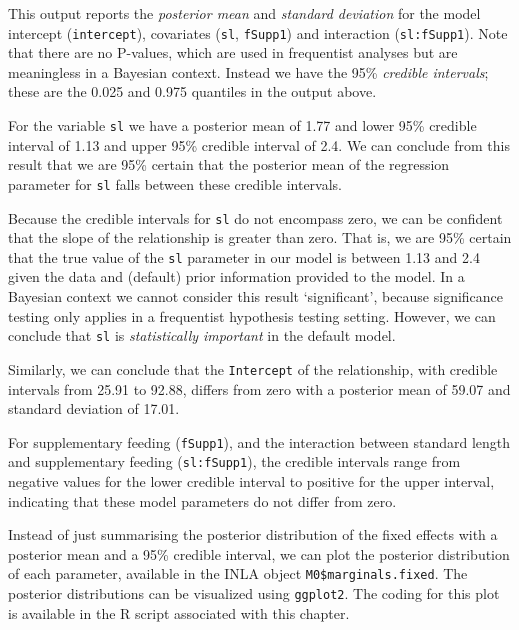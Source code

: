\documentclass[
]{book}
\begin{document}
This output reports the \emph{posterior mean} and \emph{standard deviation} for the model intercept (\texttt{intercept}), covariates (\texttt{sl}, \texttt{fSupp1}) and interaction (\texttt{sl:fSupp1}). Note that there are no P-values, which are used in frequentist analyses but are meaningless in a Bayesian context. Instead we have the 95\% \emph{credible intervals}; these are the 0.025 and 0.975 quantiles in the output above.

For the variable \texttt{sl} we have a posterior mean of 1.77 and lower 95\% credible interval of 1.13 and upper 95\% credible interval of 2.4. We can conclude from this result that we are 95\% certain that the posterior mean of the regression parameter for \texttt{sl} falls between these credible intervals.

Because the credible intervals for \texttt{sl} do not encompass zero, we can be confident that the slope of the relationship is greater than zero. That is, we are 95\% certain that the true value of the \texttt{sl} parameter in our model is between 1.13 and 2.4 given the data and (default) prior information provided to the model. In a Bayesian context we cannot consider this result `significant', because significance testing only applies in a frequentist hypothesis testing setting. However, we can conclude that \texttt{sl} is \emph{statistically important} in the default model.

Similarly, we can conclude that the \texttt{Intercept} of the relationship, with credible intervals from 25.91 to 92.88, differs from zero with a posterior mean of 59.07 and standard deviation of 17.01.

For supplementary feeding (\texttt{fSupp1}), and the interaction between standard length and supplementary feeding (\texttt{sl:fSupp1}), the credible intervals range from negative values for the lower credible interval to positive for the upper interval, indicating that these model parameters do not differ from zero.

Instead of just summarising the posterior distribution of the fixed effects with a posterior mean and a 95\% credible interval, we can plot the posterior distribution of each parameter, available in the INLA object \texttt{M0\$marginals.fixed}.
The posterior distributions can be visualized using \texttt{ggplot2}. The coding for this plot is available in the R script associated with this chapter.
\end{document}
